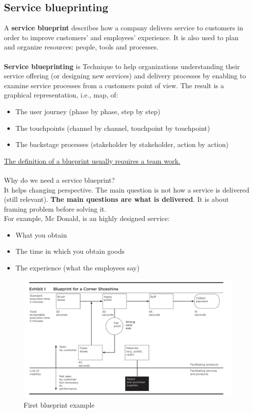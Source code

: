 \documentclass[10pt,a4paper]{article}
\begin{document}
\subsection{Service blueprinting}
A \textbf{service blueprint} describes how a company delivers service to customers in order to improve customers' and employees’ experience. It is also used to plan and organize resources: people, tools and processes. \\ \\
\textbf{Service blueprinting} is Technique to help organizations understanding their service offering (or designing new services) and delivery processes by enabling to examine service processes from a customers point of view. The result is a graphical representation, i.e., map, of:
\begin{itemize}
	\item The user journey (phase by phase, step by step)
	\item The touchpoints (channel by channel, touchpoint by touchpoint)
	\item The backstage processes (stakeholder by stakeholder, action by action)
\end{itemize}
\uline{The definition of a blueprint usually requires a team work.} \\ \\
Why do we need a service blueprint?  \\
It helps changing perspective. The main question is not how a service is delivered (still relevant). \textbf{The main questions are what is delivered}. It is about framing problem before solving it. 
\\ 
For example, Mc Donald, is an highly designed service:
\begin{itemize}
	\item What you obtain
	\item The time in which you obtain goods
	\item The experience (what the employees say)
\end{itemize}
\pagebreak
\begin{figure}[ht!]
 \hfill \includegraphics[width=350pt]{images/first-blueprint}\hspace*{\fill}
 \caption{First blueprint example}
  \label{fig:first-blueprint}
\end{figure}
\end{document}
